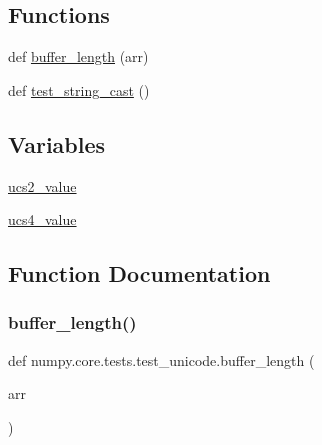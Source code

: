 \subsection*{Functions}
\begin{DoxyCompactItemize}
\item 
def \hyperlink{namespacenumpy_1_1core_1_1tests_1_1test__unicode_abf9d29e8528c5e4d0107f752cf32f866}{buffer\+\_\+length} (arr)
\item 
def \hyperlink{namespacenumpy_1_1core_1_1tests_1_1test__unicode_a4fb0dda83f4f7759ac9961a260815327}{test\+\_\+string\+\_\+cast} ()
\end{DoxyCompactItemize}
\subsection*{Variables}
\begin{DoxyCompactItemize}
\item 
\hyperlink{namespacenumpy_1_1core_1_1tests_1_1test__unicode_abe1b8d5cc296966ff6711ca09b9d805e}{ucs2\+\_\+value}
\item 
\hyperlink{namespacenumpy_1_1core_1_1tests_1_1test__unicode_a65ea89a42f17ee4b2e6afb55746ed30a}{ucs4\+\_\+value}
\end{DoxyCompactItemize}


\subsection{Function Documentation}
\mbox{\label{namespacenumpy_1_1core_1_1tests_1_1test__unicode_abf9d29e8528c5e4d0107f752cf32f866}} 
\subsubsection{\texorpdfstring{buffer\+\_\+length()}{buffer\_length()}}
{\footnotesize\ttfamily def numpy.\+core.\+tests.\+test\+\_\+unicode.\+buffer\+\_\+length (\begin{DoxyParamCaption}\item[{}]{arr }\end{DoxyParamCaption})}

\mbox{\label{namespacenumpy_1_1core_1_1tests_1_1test__unicode_a4fb0dda83f4f7759ac9961a260815327}} 
